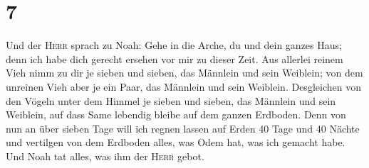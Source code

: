 \hypertarget{section-6}{%
\section{7}\label{section-6}}

 Und der \textsc{Herr} sprach zu Noah: Gehe in die Arche,
du und dein ganzes Haus; denn ich habe dich gerecht ersehen vor mir zu
dieser Zeit.  Aus allerlei reinem Vieh nimm zu dir je
sieben und sieben, das Männlein und sein Weiblein; von dem unreinen Vieh
aber je ein Paar, das Männlein und sein Weiblein. 
Desgleichen von den Vögeln unter dem Himmel je sieben und sieben, das
Männlein und sein Weiblein, auf dass Same lebendig bleibe auf dem ganzen
Erdboden.  Denn von nun an über sieben Tage will ich
regnen lassen auf Erden 40 Tage und 40 Nächte und vertilgen von dem
Erdboden alles, was Odem hat, was ich gemacht habe.  Und
Noah tat alles, was ihm der \textsc{Herr} gebot.


